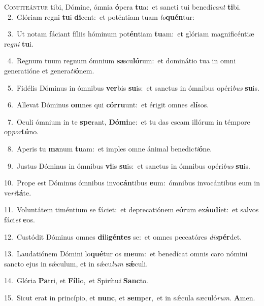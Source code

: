 \lettrine{\initial\textcolor{\initialcolor}{C}}{onfiteántur} tibi, Dómine, ómnia \textbf{ó}\-pera \textbf{tu}\-a:~\star et sancti tui benedí\textit{cant} \textbf{ti}\-bi.\\
{\numbfont\textcolor{\numbcolor}{~2.}}~Glóriam regni \textbf{tu}\-i \textbf{di}\-cent:~\star et poténtiam tuam \textit{lo}\-\textbf{quén}tur:\par
{\numbfont\textcolor{\numbcolor}{~3.}}~Ut notam fáciant fíliis hóminum pot\-\textbf{én}\-tiam \textbf{tu}\-am:~\star et glóriam magnificéntiæ re\textit{gni} \textbf{tu}\-i.\par
{\numbfont\textcolor{\numbcolor}{~4.}}~Regnum tuum regnum ómnium \textbf{sæ}\-cu\-\textbf{ló}\-rum:~\star et dominátio tua in omni generatióne et genera\-\textit{ti}\-\textbf{ó}nem.\par
{\numbfont\textcolor{\numbcolor}{~5.}}~Fidélis Dóminus in ómnibus \textbf{ver}\-bis \textbf{su}\-is:~\star et sanctus in ómnibus opéri\textit{bus} \textbf{su}\-is.\par
{\numbfont\textcolor{\numbcolor}{~6.}}~Allevat Dóminus \textbf{om}\-nes qui \textbf{cór}\-\textbf{ru}unt:~\star et érigit omnes \textit{e}\-\textbf{lí}sos.\par
{\numbfont\textcolor{\numbcolor}{~7.}}~Oculi ómnium in te \textbf{spe}\-rant, \textbf{Dó}\-\textbf{mi}ne:~\star et tu das escam illórum in témpore op\-\textit{por}\-\textbf{tú}no.\par
{\numbfont\textcolor{\numbcolor}{~8.}}~Aperis tu \textbf{ma}\-num \textbf{tu}\-am:~\star et imples omne ánimal benedic\-\textit{ti}\-\textbf{ó}ne.\par
{\numbfont\textcolor{\numbcolor}{~9.}}~Justus Dóminus in ómnibus \textbf{vi}\-is \textbf{su}\-is:~\star et sanctus in ómnibus opéri\textit{bus} \textbf{su}\-is.\par
{\numbfont\textcolor{\numbcolor}{10.}}~Prope est Dóminus ómnibus invo\-\textbf{cán}\-tibus \textbf{e}\-um:~\star ómnibus invocántibus eum in ve\-\textit{ri}\-\textbf{tá}te.\par
{\numbfont\textcolor{\numbcolor}{11.}}~Voluntátem timéntium se fáciet:~\dagger et deprecatiónem e\-\textbf{ó}\-rum ex\-\textbf{áu}\-\textbf{di}et:~\star et salvos fáci\textit{et} \textbf{e}\-os.\par
{\numbfont\textcolor{\numbcolor}{12.}}~Custódit Dóminus omnes \textbf{di}\-li\-\textbf{gén}\-\textbf{tes} se:~\star et omnes peccatóres \textit{dis}\-\textbf{pér}det.\par
{\numbfont\textcolor{\numbcolor}{13.}}~Laudatiónem Dómini lo\-\textbf{qué}\-tur os \textbf{me}\-um:~\star et benedícat omnis caro nómini sancto ejus in sǽculum, et in sǽcu\textit{lum} \textbf{sǽ}\-culi.\par
{\numbfont\textcolor{\numbcolor}{14.}}~Glória \textbf{Pa}\-tri, et \textbf{Fí}\-\textbf{li}o,~\star et Spirítu\textit{i} \textbf{Sanc}\-to.\par
{\numbfont\textcolor{\numbcolor}{15.}}~Sicut erat in princípio, et \textbf{nunc}\-, et \textbf{sem}\-per,~\star et in sǽcula sæculó\-\textit{rum}\-. \textbf{A}\-men.\par
